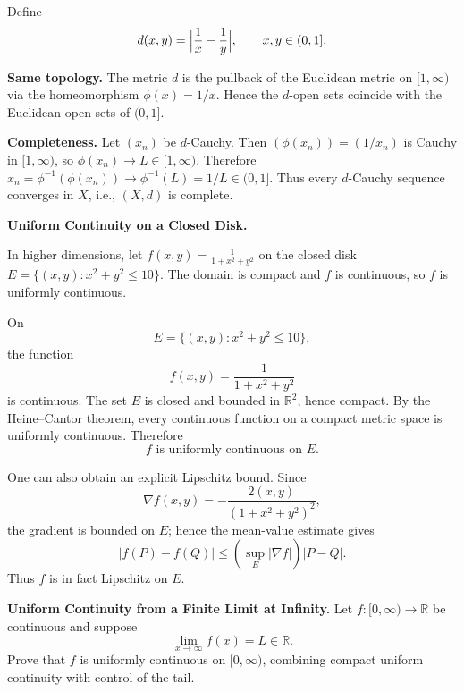 \begin{solution}
Define
\[
d(x,y)=\Bigl|\frac{1}{x}-\frac{1}{y}\Bigr|,\qquad x,y\in(0,1].
\]

\noindent\textbf{Same topology.}
The metric \(d\) is the pullback of the Euclidean metric on \([1,\infty)\) via the homeomorphism \(\phi(x)=1/x\).
Hence the \(d\)-open sets coincide with the Euclidean-open sets of \((0,1]\).

\smallskip

\noindent\textbf{Completeness.}
Let \((x_n)\) be \(d\)-Cauchy. Then \((\phi(x_n))=(1/x_n)\) is Cauchy in \([1,\infty)\),
so \(\phi(x_n)\to L\in[1,\infty)\).
Therefore \(x_n=\phi^{-1}(\phi(x_n))\to \phi^{-1}(L)=1/L\in(0,1]\).
Thus every \(d\)-Cauchy sequence converges in \(X\), i.e., \((X,d)\) is complete.

\smallskip
\end{solution}

\begin{problem}[CP-II-0035]
\label{prob:cp-ii-0035}
\textbf{Uniform Continuity on a Closed Disk.}

\hspace*{1.5em}In higher dimensions, let $f(x,y)=\tfrac{1}{1+x^2+y^2}$ on the closed disk
		$E=\{(x,y):x^2+y^2\leq 10\}$.
		The domain is compact and $f$ is continuous, so $f$ is uniformly continuous.
\end{problem}

\begin{solution}
On
\[
E=\{(x,y):x^2+y^2\le10\},
\]
the function
\[
f(x,y)=\frac1{1+x^2+y^2}
\]
is continuous. The set \(E\) is closed and bounded in \(\mathbb R^2\), hence compact. By the Heine--Cantor theorem, every continuous function on a compact metric space is uniformly continuous. Therefore
\[
\boxed{f\text{ is uniformly continuous on }E.}
\]

One can also obtain an explicit Lipschitz bound. Since
\[
\nabla f(x,y)
=
-\frac{2(x,y)}{(1+x^2+y^2)^2},
\]
the gradient is bounded on \(E\); hence the mean-value estimate gives
\[
|f(P)-f(Q)|
\le
\left(\sup_E|\nabla f|\right)|P-Q|.
\]
Thus \(f\) is in fact Lipschitz on \(E\).
\end{solution}


\begin{problem}[CP-II-0052]
\label{prob:cp-ii-0052}
\textbf{Uniform Continuity from a Finite Limit at Infinity.}
Let \(f:[0,\infty)\to\mathbb R\) be continuous and suppose
\[
\lim_{x\to\infty}f(x)=L\in\mathbb R.
\]
Prove that \(f\) is uniformly continuous on \([0,\infty)\), combining compact
uniform continuity with control of the tail.
\end{problem}

